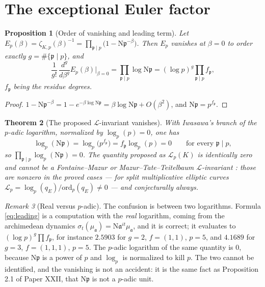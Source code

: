 \documentclass[11pt]{amsart}
\numberwithin{equation}{section}
\newtheorem{theorem}{Theorem}[section]
\newtheorem{proposition}[theorem]{Proposition}
\theoremstyle{definition}
\theoremstyle{remark}
\newtheorem{remark}[theorem]{Remark}
\newcommand{\cL}{\mathcal{L}}
\newcommand{\pp}{\mathfrak{p}}
\newcommand{\aaa}{\mathfrak{a}}
\newcommand{\Ns}{\mathrm{N}}
\begin{document}
\section{The exceptional Euler factor}

\begin{proposition}[Order of vanishing and leading term]\label{prop:euler}
Let $E_p(\beta)=\zeta_{K,p}(\beta)^{-1}=\prod_{\pp\mid p}\bigl(1-\Ns\pp^{-\beta}\bigr)$. Then
$E_p$ vanishes at $\beta=0$ to order exactly $g=\#\{\pp\mid p\}$, and
\begin{equation}\label{eq:leading}
\frac{1}{g!}\,\frac{d^g}{d\beta^g}E_p(\beta)\Big|_{\beta=0}
=\prod_{\pp\mid p}\log\Ns\pp=(\log p)^g\prod_{\pp\mid p}f_\pp ,
\end{equation}
$f_\pp$ being the residue degrees.
\end{proposition}

\begin{proof}
$1-\Ns\pp^{-\beta}=1-e^{-\beta\log\Ns\pp}=\beta\log\Ns\pp+O(\beta^2)$, and
$\Ns\pp=p^{f_\pp}$.
\end{proof}

\begin{theorem}[The proposed $\cL$-invariant vanishes]\label{thm:Lzero}
With Iwasawa's branch of the $p$-adic logarithm, normalized by $\log_p(p)=0$, one has
\[
\log_p(\Ns\pp)=\log_p\bigl(p^{f_\pp}\bigr)=f_\pp\log_p(p)=0
\qquad\text{for every }\pp\mid p ,
\]
so $\prod_{\pp\mid p}\log_p(\Ns\pp)=0$. The quantity proposed as
$\cL_p(K)$ is identically zero and cannot be a Fontaine--Mazur or
Mazur--Tate--Teitelbaum $\cL$-invariant \cite{MTT,GreenbergSteven}: those are nonzero in
the proved cases --- for split multiplicative elliptic curves
$\cL_p=\log_p(q_E)/\mathrm{ord}_p(q_E)\ne0$ --- and conjecturally always.
\end{theorem}

\begin{remark}[Real versus $p$-adic]\label{rem:realvsp}
The confusion is between two logarithms. Formula \eqref{eq:leading} is a computation with the
\emph{real} logarithm, coming from the archimedean dynamics
$\sigma_t(\mu_\aaa)=\Ns\aaa^{it}\mu_\aaa$, and it is correct; it evaluates to
$(\log p)^g\prod f_\pp$, for instance $2.5903$ for $g=2$, $f=(1,1)$, $p=5$, and $4.1689$ for
$g=3$, $f=(1,1,1)$, $p=5$. The $p$-adic logarithm of the same quantity is $0$, because
$\Ns\pp$ is a power of $p$ and $\log_p$ is normalized to kill $p$. The two cannot be
identified, and the vanishing is not an accident: it is the same fact as
Proposition 2.1 of Paper XXII, that $\Ns\pp$ is not a $p$-adic unit.
\end{remark}
\end{document}
